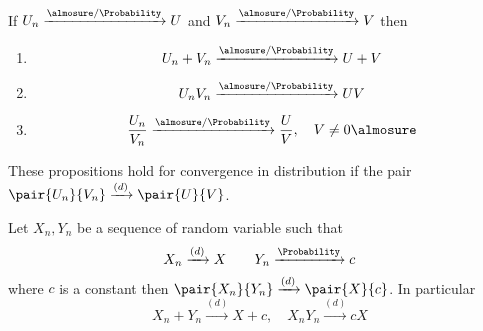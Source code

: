\begin{proposition}
    If \(U_n \xrightarrow{\almosure / \Probability} U\) and \(V_n \xrightarrow{\almosure / \Probability} V\) then 
    \begin{enumerate}
        \item 
    \begin{equation*}
        U_n + V_n \xrightarrow{\almosure / \Probability} U + V
    \end{equation*}
    \item 
    \begin{equation*}
        U_n V_n \xrightarrow{\almosure / \Probability} U  V
    \end{equation*}
    \item 
    \begin{equation*}
        \frac{U_n}{V_n} \xrightarrow{\almosure / \Probability} \frac{U}{V}, \quad V \neq 0 \almosure
    \end{equation*}
\end{enumerate}
    These propositions hold for convergence in distribution if the pair \(\pair{U_n}{V_n} \xrightarrow{(d)} \pair{U}{V}\).
\end{proposition}

\begin{theorem}
    Let \(X_n, Y_n\) be a sequence of random variable such that 
    \begin{equation*}
        X_n \xrightarrow{(d)} X \qquad Y_n \xrightarrow{\Probability} c
    \end{equation*}
    where \(c\) is a constant then \(\pair{X_n}{Y_n} \xrightarrow{(d)} \pair{X}{c}\). In particular
    \begin{equation*}
        X_n + Y_n \xrightarrow{(d)} X + c , \quad X_nY_n \xrightarrow{(d)} cX
    \end{equation*}
\end{theorem}

